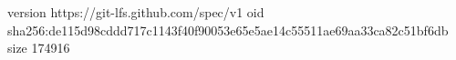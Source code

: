 version https://git-lfs.github.com/spec/v1
oid sha256:de115d98cddd717c1143f40f90053e65e5ae14c55511ae69aa33ca82c51bf6db
size 174916
